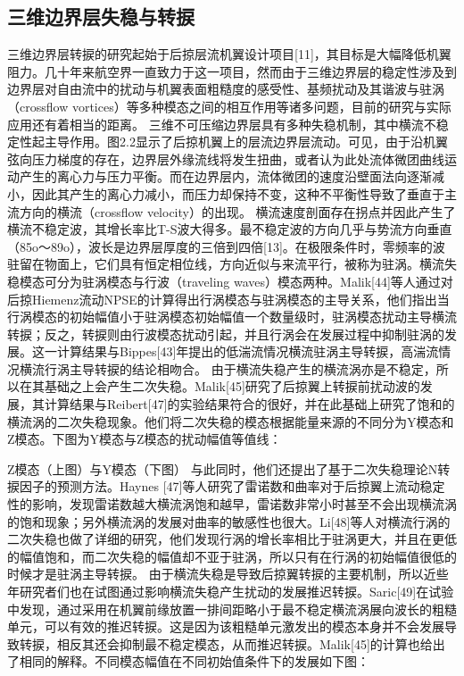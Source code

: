 \subsection{三维边界层失稳与转捩}
三维边界层转捩的研究起始于后掠层流机翼设计项目[11]，其目标是大幅降低机翼阻力。几十年来航空界一直致力于这一项目，然而由于三维边界层的稳定性涉及到边界层对自由流中的扰动与机翼表面粗糙度的感受性、基频扰动及其谐波与驻涡（crossflow vortices）等多种模态之间的相互作用等诸多问题，目前的研究与实际应用还有着相当的距离。
三维不可压缩边界层具有多种失稳机制，其中横流不稳定性起主导作用。图2.2显示了后掠机翼上的层流边界层流动。可见，由于沿机翼弦向压力梯度的存在，边界层外缘流线将发生扭曲，或者认为此处流体微团曲线运动产生的离心力与压力平衡。而在边界层内，流体微团的速度沿壁面法向逐渐减小，因此其产生的离心力减小，而压力却保持不变，这种不平衡性导致了垂直于主流方向的横流（crossflow velocity）的出现。
横流速度剖面存在拐点并因此产生了横流不稳定波，其增长率比T-S波大得多。最不稳定波的方向几乎与势流方向垂直（85o～89o），波长是边界层厚度的三倍到四倍[13]。在极限条件时，零频率的波驻留在物面上，它们具有恒定相位线，方向近似与来流平行，被称为驻涡。横流失稳模态可分为驻涡模态与行波（traveling waves）模态两种。Malik[44]等人通过对后掠Hiemenz流动NPSE的计算得出行涡模态与驻涡模态的主导关系，他们指出当行涡模态的初始幅值小于驻涡模态初始幅值一个数量级时，驻涡模态扰动主导横流转捩；反之，转捩则由行波模态扰动引起，并且行涡会在发展过程中抑制驻涡的发展。这一计算结果与Bippes[43]年提出的低湍流情况横流驻涡主导转捩，高湍流情况横流行涡主导转捩的结论相吻合。
由于横流失稳产生的横流涡亦是不稳定，所以在其基础之上会产生二次失稳。Malik[45]研究了后掠翼上转捩前扰动波的发展，其计算结果与Reibert[47]的实验结果符合的很好，并在此基础上研究了饱和的横流涡的二次失稳现象。他们将二次失稳的模态根据能量来源的不同分为Y模态和Z模态。下图为Y模态与Z模态的扰动幅值等值线：

Z模态（上图）与Y模态（下图）
与此同时，他们还提出了基于二次失稳理论N转捩因子的预测方法。Haynes [47]等人研究了雷诺数和曲率对于后掠翼上流动稳定性的影响，发现雷诺数越大横流涡饱和越早，雷诺数非常小时甚至不会出现横流涡的饱和现象；另外横流涡的发展对曲率的敏感性也很大。Li[48]等人对横流行涡的二次失稳也做了详细的研究，他们发现行涡的增长率相比于驻涡更大，并且在更低的幅值饱和，而二次失稳的幅值却不亚于驻涡，所以只有在行涡的初始幅值很低的时候才是驻涡主导转捩。
由于横流失稳是导致后掠翼转捩的主要机制，所以近些年研究者们也在试图通过影响横流失稳产生扰动的发展推迟转捩。Saric[49]在试验中发现，通过采用在机翼前缘放置一排间距略小于最不稳定横流涡展向波长的粗糙单元，可以有效的推迟转捩。这是因为该粗糙单元激发出的模态本身并不会发展导致转捩，相反其还会抑制最不稳定模态，从而推迟转捩。Malik[45]的计算也给出了相同的解释。不同模态幅值在不同初始值条件下的发展如下图：

